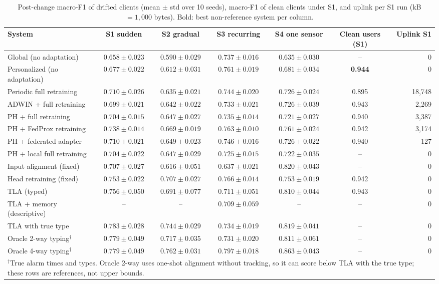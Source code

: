 \documentclass[conference]{IEEEtran}
\newcommand{\fone}{macro-F1}
\newcommand{\tla}{TLA}
\begin{document}
\begin{table}[t]
\centering
\caption{Post-change \fone{} of drifted clients (mean $\pm$ std over 10 seeds), \fone{} of clean clients under S1, and uplink per S1 run (kB $=1{,}000$ bytes). Bold: best non-reference system per column.}\label{tab:all}
\small
\setlength{\tabcolsep}{4.5pt}
\begin{tabular}{lcccccr}
\toprule
System & S1 sudden & S2 gradual & S3 recurring & S4 one sensor & Clean users (S1) & Uplink S1 \\
\midrule
Global (no adaptation) & $0.658\pm0.023$ & $0.590\pm0.029$ & $0.737\pm0.016$ & $0.635\pm0.030$ & -- & 0 \\
Personalized (no adaptation) & $0.677\pm0.022$ & $0.612\pm0.031$ & $0.761\pm0.019$ & $0.681\pm0.034$ & \textbf{0.944} & 0 \\
Periodic full retraining & $0.710\pm0.026$ & $0.635\pm0.021$ & $0.744\pm0.020$ & $0.726\pm0.024$ & 0.895 & 18{,}748 \\
ADWIN + full retraining & $0.699\pm0.021$ & $0.642\pm0.022$ & $0.733\pm0.021$ & $0.726\pm0.039$ & 0.943 & 2{,}269 \\
PH + full retraining & $0.704\pm0.015$ & $0.647\pm0.027$ & $0.735\pm0.014$ & $0.721\pm0.027$ & 0.940 & 3{,}387 \\
PH + FedProx retraining & $0.738\pm0.014$ & $0.669\pm0.019$ & $0.763\pm0.010$ & $0.761\pm0.024$ & 0.942 & 3{,}174 \\
PH + federated adapter & $0.710\pm0.021$ & $0.649\pm0.023$ & $0.746\pm0.016$ & $0.726\pm0.022$ & 0.940 & 127 \\
PH + local full retraining & $0.704\pm0.022$ & $0.647\pm0.029$ & $0.725\pm0.015$ & $0.722\pm0.035$ & -- & 0 \\
Input alignment (fixed) & $0.707\pm0.027$ & $0.616\pm0.051$ & $0.637\pm0.021$ & $\mathbf{0.820}\pm0.043$ & -- & 0 \\
Head retraining (fixed) & $0.753\pm0.022$ & $\mathbf{0.707}\pm0.027$ & $\mathbf{0.766}\pm0.014$ & $0.753\pm0.019$ & 0.942 & 0 \\
\tla{} (typed) & $\mathbf{0.756}\pm0.050$ & $0.691\pm0.077$ & $0.711\pm0.051$ & $0.810\pm0.044$ & 0.943 & 0 \\
\tla{} + memory (descriptive) & -- & -- & $0.709\pm0.059$ & -- & -- & 0 \\
\midrule
\tla{} with true type & $0.783\pm0.028$ & $0.744\pm0.029$ & $0.734\pm0.019$ & $0.819\pm0.041$ & -- & 0 \\
Oracle 2-way typing$^{\dagger}$ & $0.779\pm0.049$ & $0.717\pm0.035$ & $0.731\pm0.020$ & $0.811\pm0.061$ & -- & 0 \\
Oracle 4-way typing$^{\dagger}$ & $0.779\pm0.049$ & $0.762\pm0.031$ & $0.797\pm0.018$ & $0.863\pm0.043$ & -- & 0 \\
\bottomrule
\multicolumn{7}{l}{\footnotesize $^{\dagger}$True alarm times and types. Oracle 2-way uses one-shot alignment without tracking, so it can score below \tla{} with the true type; these rows are references, not upper bounds.}
\end{tabular}
\end{table}
\end{document}
